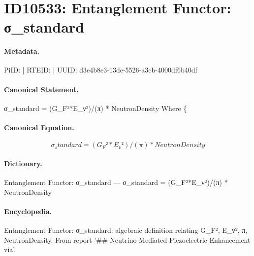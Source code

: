 \section*{ID10533: Entanglement Functor: σ\_standard}
\paragraph{Metadata.}
PiID:  | RTEID:  | UUID: d3e4b8e3-13de-5526-a3cb-4000df6b40df

\paragraph{Canonical Statement.}
σ\_standard = (G\_F²*E\_ν²)/(π) * NeutronDensity Where \{

\paragraph{Canonical Equation.}
\[
σ_standard = (G_F²*E_ν²)/(π) * NeutronDensity
\]

\paragraph{Dictionary.}
Entanglement Functor: σ\_standard — σ\_standard = (G\_F²*E\_ν²)/(π) * NeutronDensity

\paragraph{Encyclopedia.}
Entanglement Functor: σ\_standard: algebraic definition relating G\_F², E\_ν², π, NeutronDensity. From report '\#\# Neutrino-Mediated Piezoelectric Enhancement via'.
